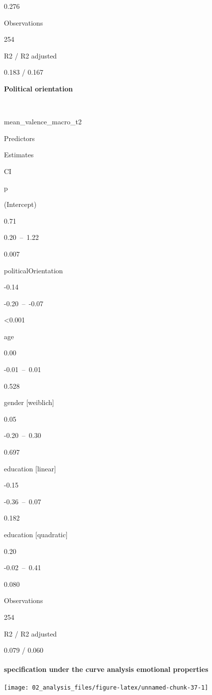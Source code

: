 \documentclass[
]{article}
\begin{document}
0.276

Observations

254

R2 / R2 adjusted

0.183 / 0.167

\textbf{Political orientation}

~

mean\_valence\_macro\_t2

Predictors

Estimates

CI

p

(Intercept)

0.71

0.20~--~1.22

0.007

politicalOrientation

-0.14

-0.20~--~-0.07

\textless0.001

age

0.00

-0.01~--~0.01

0.528

gender {[}weiblich{]}

0.05

-0.20~--~0.30

0.697

education {[}linear{]}

-0.15

-0.36~--~0.07

0.182

education {[}quadratic{]}

0.20

-0.02~--~0.41

0.080

Observations

254

R2 / R2 adjusted

0.079 / 0.060

\hypertarget{specification-under-the-curve-analysis-emotional-properties}{%
\paragraph{specification under the curve analysis emotional
properties}\label{specification-under-the-curve-analysis-emotional-properties}}

\begin{center}\texttt{[image: 02\_analysis\_files/figure-latex/unnamed-chunk-37-1]} \end{center}
\end{document}
